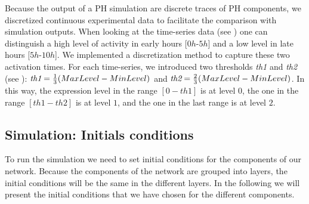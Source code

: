 Because the output of a PH simulation are discrete traces of PH components, we discretized continuous experimental data to facilitate 
the comparison with simulation outputs.
When looking at the time-series data (see ) one can distinguish a high level of
activity in early hours [$0h$-$5h$] and a low level in late hours [$5h$-$10h$]. We implemented a discretization method to capture these
two activation times. For each time-series, we introduced two thresholds \emph{th1} and \emph{th2} (see ): 
$\emph{th1}=\frac{1}{3}(MaxLevel-MinLevel)$ and $\emph{th2}=\frac{2}{3}(MaxLevel-MinLevel)$. 
In this way, the expression level in the range $[0-th1]$ is at level $0$, the one in the range $[th1-th2]$ is at level $1$, and the one in the last range is at
level $2$. 


\subsection{Simulation: Initials conditions}
To run the simulation we need to set initial conditions for the components of our network. Because the components of the network are grouped into 
layers, the initial conditions will be the same in the different layers. In the following we will present the initial conditions that we have chosen for the different 
components.


